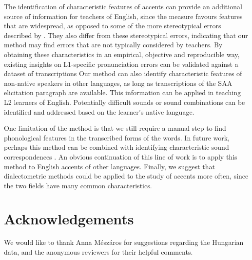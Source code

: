 \documentclass[output=paper]{LSP/langsci}
\begin{document}
The identification of characteristic features of accents can provide an additional source of information for teachers of English, since the measure favours features that are widespread, as opposed to some of the more stereotypical errors described by \citet{van_den_doel_evaluation_2006}. They also differ from these stereotypical errors, indicating that our method may find errors that are not typically considered by teachers. By obtaining these characteristics in an empirical, objective and reproducible way, existing insights on L1-specific pronunciation errors can be validated against a dataset of transcriptions Our method can also identify characteristic features of non-native speakers in other languages, as long as transcriptions of the SAA elicitation paragraph are available. This information can be applied in teaching L2 learners of English. Potentially difficult sounds or sound combinations can be identified and addressed based on the learner's native language.

One limitation of the method is that we still require a manual step to find phonological features in the transcribed forms of the words. In future work, perhaps this method can be combined with identifying characteristic sound correspondences \citep{wieling_bipartite_2011}. An obvious continuation of this line of work is to apply this method to English accents of other languages. Finally, we suggest that dialectometric methods could be applied to the study of accents more often, since the two fields have many common characteristics.

\section*{Acknowledgements}

We would like to thank Anna M\'{e}sz\'{a}ros for suggestions regarding the Hungarian data, and the anonymous reviewers for their helpful comments.


\printbibliography[heading=subbibliography,notkeyword=this]
\end{document}
